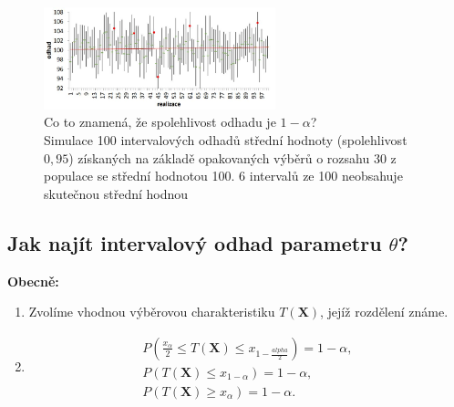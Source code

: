 \begin{figure}[H]
\centering
\includegraphics[width=0.6\textwidth]{assets/14_spolehlivost_odhadu}
\caption{Co to znamená, že spolehlivost odhadu je $1- \alpha$? \\Simulace 100 intervalových odhadů střední hodnoty (spolehlivost $0,95$) získaných na základě opakovaných výběrů o rozsahu 30 z populace se střední hodnotou 100. 6 intervalů ze 100 neobsahuje skutečnou střední hodnou}
\end{figure}
\subsection{Jak najít intervalový odhad parametru $\theta$?}
\textbf{Obecně:}
\begin{enumerate}
	\item Zvolíme vhodnou výběrovou charakteristiku $T(\mathbf{X})$, jejíž rozdělení známe.
	\item \begin{equation*}
			\begin{split}
				P(\frac{x_\alpha}{2} \leq T(\mathbf{X}) \leq x_{1 - \frac{alpha}{2}}) = 1 - \alpha, \\
				P(T(\mathbf{X}) \leq x_{1-\alpha}) = 1 - \alpha, \\
				P(T(\mathbf{X}) \geq x_\alpha) = 1 - \alpha.	
			\end{split}
		\end{equation*}
\end{enumerate}
